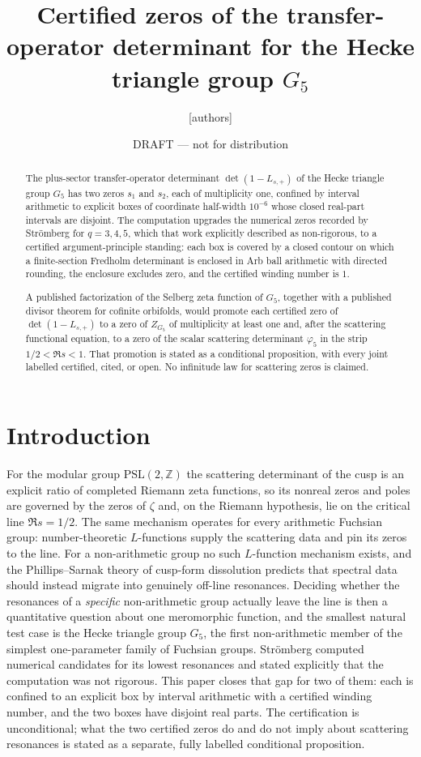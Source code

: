 \documentclass[11pt]{amsart}
\title[Certified $G_5$ transfer-operator zeros]{Certified zeros of the transfer-operator determinant for the Hecke triangle group $G_5$}
\author{[authors]}
\date{DRAFT --- not for distribution}
\theoremstyle{definition}
\theoremstyle{remark}
\begin{document}
\begin{abstract}
The plus-sector transfer-operator determinant $\det(1-L_{s,+})$ of the
Hecke triangle group $G_5$ has two zeros $s_1$ and $s_2$, each of
multiplicity one, confined by interval arithmetic to explicit boxes of
coordinate half-width $10^{-6}$ whose closed real-part intervals are
disjoint. The computation upgrades the numerical zeros recorded by
Str\"omberg for $q=3,4,5$, which that work explicitly described as
non-rigorous, to a certified argument-principle standing: each box is
covered by a closed contour on which a finite-section Fredholm
determinant is enclosed in Arb ball arithmetic with directed rounding,
the enclosure excludes zero, and the certified winding number is $1$.

A published factorization of the Selberg zeta function of $G_5$,
together with a published divisor theorem for cofinite orbifolds,
would promote each certified zero of $\det(1-L_{s,+})$ to a zero of
$Z_{G_5}$ of multiplicity at least one and, after the scattering
functional equation, to a zero of the scalar scattering determinant
$\varphi_5$ in the strip $1/2<\Re s<1$. That promotion is stated as a
conditional proposition, with every joint labelled certified, cited,
or open. No infinitude law for scattering zeros is claimed.
\end{abstract}

\maketitle

\section{Introduction}

For the modular group $\mathrm{PSL}(2,\mathbb Z)$ the scattering
determinant of the cusp is an explicit ratio of completed Riemann zeta
functions, so its nonreal zeros and poles are governed by the zeros of
$\zeta$ and, on the Riemann hypothesis, lie on the critical line
$\Re s=1/2$. The same mechanism operates for every arithmetic Fuchsian
group: number-theoretic $L$-functions supply the scattering data and
pin its zeros to the line. For a non-arithmetic group no such
$L$-function mechanism exists, and the Phillips--Sarnak theory of
cusp-form dissolution predicts that spectral data should instead
migrate into genuinely off-line resonances. Deciding whether the
resonances of a \emph{specific} non-arithmetic group actually leave the
line is then a quantitative question about one meromorphic function,
and the smallest natural test case is the Hecke triangle group $G_5$,
the first non-arithmetic member of the simplest one-parameter family of
Fuchsian groups. Str\"omberg computed numerical candidates for its
lowest resonances and stated explicitly that the computation was not
rigorous. This paper closes that gap for two of them: each is confined
to an explicit box by interval arithmetic with a certified winding
number, and the two boxes have disjoint real parts. The certification
is unconditional; what the two certified zeros do and do not imply
about scattering resonances is stated as a separate, fully labelled
conditional proposition.
\end{document}
